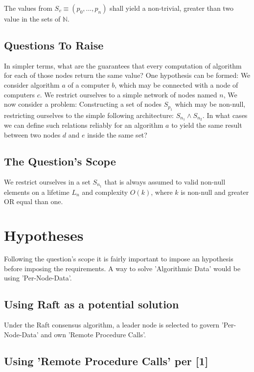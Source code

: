 \documentclass[10pt, twocolumn]{article}
\theoremstyle{plain}
\theoremstyle{definition}
\theoremstyle{remark}
\begin{document}
The values from $S_{v}\equiv{}(p_{0}, ..., p_{n})$ shall yield a non-trivial, greater than two value in the sets of $\mathbb{N}$.

\subsection{Questions To Raise}

In simpler terms, what are the guarantees that every computation of algorithm for each of those nodes return the same value? One hypothesis can be formed: We consider algorithm $a$ of a computer $b$, which may be connected with a node of computers $c$.
We restrict ourselves to a simple network of nodes named $n$, We now consider a problem: Constructing a set of nodes $S_{p_{1}}$ which may be non-null, restricting ourselves to the simple following architecture: $S_{n_{1}} \wedge S_{n_{2}}$. In what cases we can define such relations reliably for an algorithm $a$ to yield the same result between two nodes $d$ and $e$ inside the same set? 

\subsection{The Question's Scope}

We restrict ourselves in a set $S_{n_{1}}$ that is always assumed to valid non-null elements on a lifetime $L_{n}$ and complexity $O(k)$, where $k$ is non-null and greater OR equal than one.

\section{Hypotheses}

Following the question's scope it is fairly important to impose an hypothesis before imposing the requirements. A way to solve 'Algorithmic Data' would be using 'Per-Node-Data'.

\subsection{Using Raft as a potential solution}

Under the Raft consensus algorithm, a leader node is selected to govern 'Per-Node-Data' and own 'Remote Procedure Calls'. 

\subsection{Using 'Remote Procedure Calls' per [1]}
\end{document}
